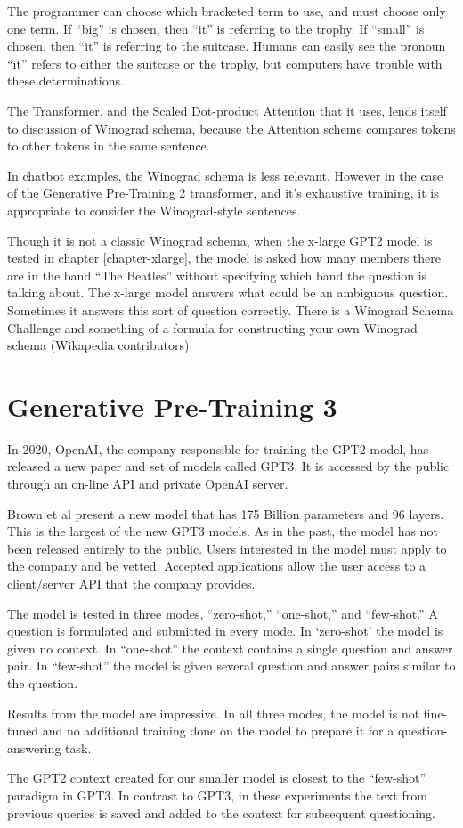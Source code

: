The programmer can choose which bracketed term to use, and must choose only one term. If ``big'' is chosen, then ``it'' is referring to the trophy. If ``small'' is chosen, then ``it'' is referring to the suitcase. Humans can easily see the pronoun ``it'' refers to either the suitcase or the trophy, but computers have trouble with these determinations.

The Transformer, and the Scaled Dot-product Attention that it uses, lends itself to discussion of Winograd schema, because the Attention scheme compares tokens to other tokens in the same sentence. 

In chatbot examples, the Winograd schema is less relevant. However in the case of the Generative Pre-Training 2 transformer, and it's exhaustive training, it is appropriate to consider the Winograd-style sentences.

Though it is not a classic Winograd schema, when the x-large GPT2 model is tested in chapter \ref{chapter-xlarge}, the model is asked how many members there are in the band ``The Beatles'' without specifying which band the question is talking about. The x-large model answers what could be an ambiguous question. Sometimes it answers this sort of question correctly. There is a Winograd Schema Challenge and something of a formula for constructing your own Winograd schema (Wikapedia contributors). \cite{wiki:xxx}

\section{Generative Pre-Training 3}

\label{discussion-gpt3}

In 2020, OpenAI, the company responsible for training the GPT2 model, has released a new paper and set of models called GPT3. It is accessed by the public through an on-line API and private OpenAI server.

Brown et al \cite{brown2020language} present a new model that has 175 Billion parameters and 96 layers. This is the largest of the new GPT3 models. As in the past, the model has not been released entirely to the public. Users interested in the model must apply to the company and be vetted. Accepted applications allow the user access to a client/server API that the company provides.

The model is tested in three modes, ``zero-shot,'' ``one-shot,'' and ``few-shot.''  A question is formulated and submitted in every mode. In `zero-shot' the model is given no  context. In ``one-shot'' the context contains a single question and answer pair. In ``few-shot'' the model is given several question and answer pairs similar to the question.

Results from the model are impressive. In all three modes, the model is not fine-tuned and no additional training done on the model to prepare it for a question-answering task.

The GPT2 context created for our smaller model is closest to the ``few-shot'' paradigm in GPT3. In contrast to GPT3, in these experiments the text from previous queries is saved and added to the context for subsequent questioning.

